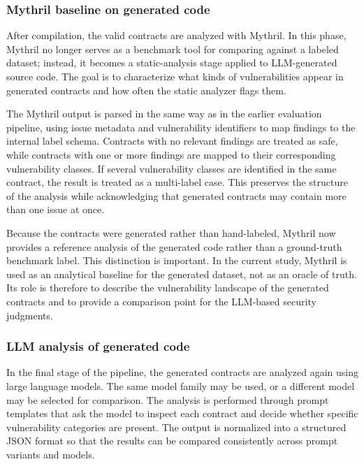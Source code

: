 \documentclass[a4paper,11pt]{article}\usepackage{graphicx} %
\begin{document}
\subsubsection{Mythril baseline on generated code}

After compilation, the valid contracts are analyzed with Mythril. In this phase, Mythril no longer serves as a benchmark tool for comparing against a labeled dataset; instead, it becomes a static-analysis stage applied to LLM-generated source code. The goal is to characterize what kinds of vulnerabilities appear in generated contracts and how often the static analyzer flags them.

The Mythril output is parsed in the same way as in the earlier evaluation pipeline, using issue metadata and vulnerability identifiers to map findings to the internal label schema. Contracts with no relevant findings are treated as safe, while contracts with one or more findings are mapped to their corresponding vulnerability classes. If several vulnerability classes are identified in the same contract, the result is treated as a multi-label case. This preserves the structure of the analysis while acknowledging that generated contracts may contain more than one issue at once.

Because the contracts were generated rather than hand-labeled, Mythril now provides a reference analysis of the generated code rather than a ground-truth benchmark label. This distinction is important. In the current study, Mythril is used as an analytical baseline for the generated dataset, not as an oracle of truth. Its role is therefore to describe the vulnerability landscape of the generated contracts and to provide a comparison point for the LLM-based security judgments.

\subsubsection{LLM analysis of generated code}

In the final stage of the pipeline, the generated contracts are analyzed again using large language models. The same model family may be used, or a different model may be selected for comparison. The analysis is performed through prompt templates that ask the model to inspect each contract and decide whether specific vulnerability categories are present. The output is normalized into a structured JSON format so that the results can be compared consistently across prompt variants and models.
\end{document}
